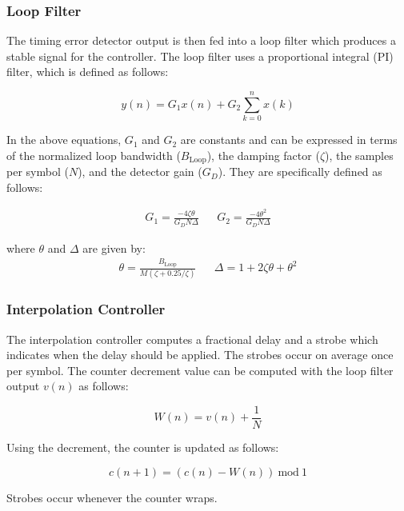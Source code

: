 \documentclass[conference,onecolumn]{IEEEtran}
\begin{document}
\subsubsection{Loop Filter}

\noindent The timing error detector output is then fed into a loop filter which produces a stable signal for the controller. The loop filter uses a proportional integral (PI) filter, which is defined as follows:

\begin{equation}
	y(n) = G_1x(n) + G_2\sum_{k=0}^{n}{x(k)}
\end{equation}

\noindent In the above equations, $G_1$ and $G_2$ are constants and can be expressed in terms of the normalized loop bandwidth ($B_{\text{Loop}}$), the damping factor ($\zeta$), the samples per symbol ($N$), and the detector gain ($G_D$). They are specifically defined as follows:

\begin{align}
	G_1 = \frac{-4\zeta\theta}{G_DN\Delta} && G_2 = \frac{-4\theta^2}{G_DN\Delta}
	\label{eq::loop_filter}
\end{align}

\noindent where $\theta$ and $\Delta$ are given by:
\begin{align}
	\theta = \frac{B_{\text{Loop}}}{M(\zeta + 0.25/\zeta)} && \Delta = 1 + 2\zeta\theta + \theta^2
\end{align}

\subsubsection{Interpolation Controller}

The interpolation controller computes a fractional delay and a strobe which indicates when the delay should be applied. The strobes occur on average once per symbol. The counter decrement value can be computed with the loop filter output $v(n)$ as follows:

\begin{equation}
	W(n) = v(n) + \frac{1}{N}
\end{equation}

\noindent Using the decrement, the counter is updated as follows:

\begin{equation}
	c(n + 1) = (c(n) - W(n))\ \text{mod}\ 1
\end{equation}

\noindent Strobes occur whenever the counter wraps.
\end{document}
